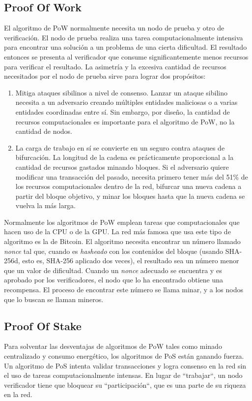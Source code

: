 \subsection{Proof Of Work}
El algoritmo de \ac{PoW} normalmente necesita un nodo de prueba y otro de verificación. El nodo de prueba realiza una tarea computacionalmente intensiva para encontrar una solución a un problema de una cierta dificultad. El resultado entonces se presenta al verificador que consume significantemente menos recursos para verificar el resultado. La asimetría y la excesiva cantidad de recursos necesitados por el nodo de prueba sirve para lograr dos propósitos:
\begin{enumerate}
    \item Mitiga ataques sibilinos a nivel de consenso. Lanzar un ataque sibilino necesita a un adversario creando múltiples entidades maliciosas o a varias entidades coordinadas entre sí. Sin embargo, por diseño, la cantidad de recursos computacionales es importante para el algoritmo de \ac{PoW}, no la cantidad de nodos.
    \item La carga de trabajo en sí se convierte en un seguro contra ataques de bifurcación. La longitud de la cadena es prácticamente proporcional a la cantidad de recursos gastados minando bloques. Si el adversario quiere modificar una transacción del pasado, necesita primero tener más del 51\% de los recursos computacionales dentro de la red, bifurcar una nueva cadena a partir del bloque objetivo, y minar los bloques hasta que la nueva cadena se vuelva la más larga.
\end{enumerate}

Normalmente los algoritmos de \ac{PoW} emplean tareas que computacionales que hacen uso de la CPU o de la GPU. La red más famosa que usa este tipo de algoritmo es la de Bitcoin. El algoritmo necesita encontrar un número llamado \textit{nonce} tal que, cuando es \textit{hasheado} con los contenidos del bloque (usando SHA-256d, esto es, SHA-256 aplicado dos veces), el resultado sea un número menor que un valor de dificultad. Cuando un \textit{nonce} adecuado se encuentra y es aprobado por los verificadores, el nodo que lo ha encontrado obtiene una recompensa. El proceso de encontrar este número se llama minar, y a los nodos que lo buscan se llaman mineros.

\subsection{Proof Of Stake}
Para solventar las desventajas de algoritmos de \ac{PoW} tales como minado centralizado y consumo energético, los algoritmos de \ac{PoS} están ganando fuerza. Un algoritmo de \ac{PoS} intenta validar transacciones y logra consenso en la red sin el uso de tareas computacionalmente intensas. En lugar de ``trabajar``, un nodo verificador tiene que bloquear su ``participación``, que es una parte de su riqueza en la red.

